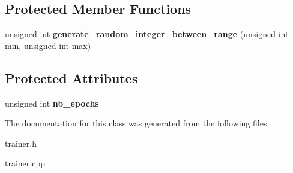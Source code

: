 \subsection*{Protected Member Functions}
\begin{DoxyCompactItemize}
\item 
\hypertarget{classTrainer_ae39aafe6ffcb181ec7401e94d36c81b1}{unsigned int {\bfseries generate\-\_\-random\-\_\-integer\-\_\-between\-\_\-range} (unsigned int min, unsigned int max)}\label{classTrainer_ae39aafe6ffcb181ec7401e94d36c81b1}

\end{DoxyCompactItemize}
\subsection*{Protected Attributes}
\begin{DoxyCompactItemize}
\item 
\hypertarget{classTrainer_a7475106292815bd6c082945c6b090c6b}{unsigned int {\bfseries nb\-\_\-epochs}}\label{classTrainer_a7475106292815bd6c082945c6b090c6b}

\end{DoxyCompactItemize}


The documentation for this class was generated from the following files\-:\begin{DoxyCompactItemize}
\item 
trainer.\-h\item 
trainer.\-cpp\end{DoxyCompactItemize}
